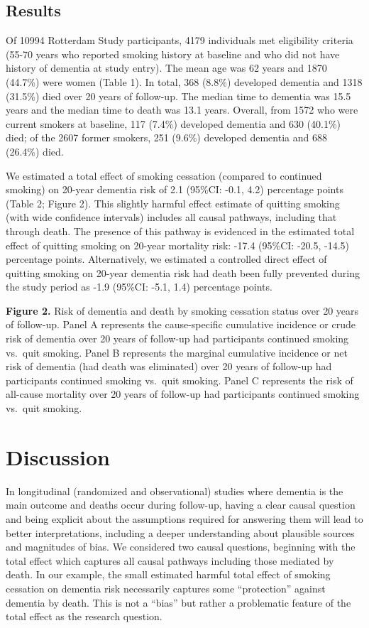 \documentclass[
]{book}
\begin{document}
\hypertarget{results-4}{%
\subsection{Results}\label{results-4}}

Of 10994 Rotterdam Study participants, 4179 individuals met eligibility criteria (55-70 years who reported smoking history at baseline and who did not have history of dementia at study entry). The mean age was 62 years and 1870 (44.7\%) were women (Table 1). In total, 368 (8.8\%) developed dementia and 1318 (31.5\%) died over 20 years of follow-up. The median time to dementia was 15.5 years and the median time to death was 13.1 years. Overall, from 1572 who were current smokers at baseline, 117 (7.4\%) developed dementia and 630 (40.1\%) died; of the 2607 former smokers, 251 (9.6\%) developed dementia and 688 (26.4\%) died.

We estimated a total effect of smoking cessation (compared to continued smoking) on 20-year dementia risk of 2.1 (95\%CI: -0.1, 4.2) percentage points (Table 2; Figure 2). This slightly harmful effect estimate of quitting smoking (with wide confidence intervals) includes all causal pathways, including that through death. The presence of this pathway is evidenced in the estimated total effect of quitting smoking on 20-year mortality risk: -17.4 (95\%CI: -20.5, -14.5) percentage points. Alternatively, we estimated a controlled direct effect of quitting smoking on 20-year dementia risk had death been fully prevented during the study period as -1.9 (95\%CI: -5.1, 1.4) percentage points.

\textbf{Figure 2.} Risk of dementia and death by smoking cessation status over 20 years of follow-up. Panel A represents the cause-specific cumulative incidence or crude risk of dementia over 20 years of follow-up had participants continued smoking vs.~quit smoking. Panel B represents the marginal cumulative incidence or net risk of dementia (had death was eliminated) over 20 years of follow-up had participants continued smoking vs.~quit smoking. Panel C represents the risk of all-cause mortality over 20 years of follow-up had participants continued smoking vs.~quit smoking.

\hypertarget{discussion-3}{%
\section{Discussion}\label{discussion-3}}

In longitudinal (randomized and observational) studies where dementia is the main outcome and deaths occur during follow-up, having a clear causal question and being explicit about the assumptions required for answering them will lead to better interpretations, including a deeper understanding about plausible sources and magnitudes of bias. We considered two causal questions, beginning with the total effect which captures all causal pathways including those mediated by death. In our example, the small estimated harmful total effect of smoking cessation on dementia risk necessarily captures some ``protection'' against dementia by death. This is not a ``bias'' but rather a problematic feature of the total effect as the research question.
\end{document}
